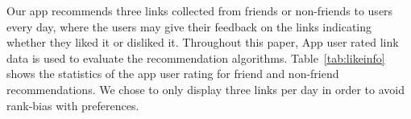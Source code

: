 
Our app recommends three links collected from friends or non-friends to users every day, 
where the users may give their feedback on the links indicating whether they liked it or
disliked it. Throughout this paper, App user rated link data is used to evaluate the recommendation algorithms.
Table~\ref{tab:likeinfo} shows the statistics of the app user rating
for friend and non-friend recommendations.  We chose to only display
three links per day in order to avoid rank-bias with preferences.

      							

